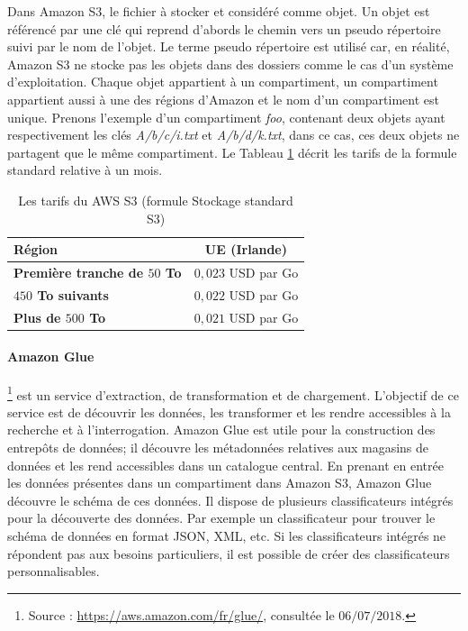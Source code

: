 Dans Amazon S3, le fichier à stocker et considéré comme objet. Un objet est référencé par une clé qui reprend d'abords le chemin vers un pseudo répertoire suivi par  le nom de l'objet.  Le terme pseudo répertoire est utilisé car, en réalité, Amazon S3 ne stocke pas les objets dans des dossiers comme le cas d'un système d'exploitation. Chaque objet appartient à un compartiment, un compartiment appartient aussi à une des régions d'Amazon et le nom d'un compartiment est unique. Prenons l'exemple d'un  compartiment \textit{foo}, contenant deux objets ayant respectivement les clés \textit{A/b/c/i.txt} et \textit{A/b/d/k.txt}, dans ce cas, ces deux objets ne partagent que le même compartiment.
Le Tableau   	\ref{tab:pricing-s3-standard} décrit les tarifs de la formule standard relative à un mois.
\begin{table}[H]
	\centering
	\captionsetup{justification=centering}
	\begin{tabular}{l c }
		\textbf{Région} & UE (Irlande) \\ \hline
		\textbf{Première tranche de $ 50 $ To} &	$ 0,023 $ USD par Go\\ \hline
		\textbf{$ 450 $ To suivants} &	$ 0,022 $ USD par Go \\ \hline
		\textbf{Plus de $ 500 $ To} &	$ 0,021 $ USD par Go\\ \hline
	\end{tabular}
	\caption{Les tarifs du AWS S3 (formule Stockage standard S3)}
	\label{tab:pricing-s3-standard}
\end{table}


\paragraph{Amazon  Glue} \label{aws:glue}
\footnote{Source : \url{https://aws.amazon.com/fr/glue/}, consultée le $06/07/2018$.} est un service d'extraction, de transformation et de chargement. L'objectif de ce service est de découvrir les données, les transformer et les rendre accessibles à la recherche et à l'interrogation.  Amazon Glue  est utile pour la construction des entrepôts de données; il découvre les métadonnées relatives aux magasins de données et les rend accessibles dans un catalogue central. En prenant en entrée les données  présentes dans un compartiment dans Amazon S3, Amazon Glue découvre le schéma de ces données. Il dispose de plusieurs classificateurs intégrés pour la découverte des données. Par exemple un classificateur pour trouver le schéma  de données en format JSON, XML, etc. Si les classificateurs intégrés ne répondent pas aux besoins particuliers, il est possible de créer des classificateurs personnalisables. 

